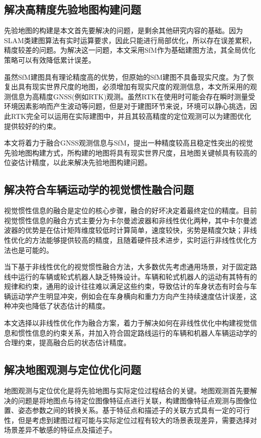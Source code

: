 \subsection{解决高精度先验地图构建问题}

先验地图的构建是本文首先要解决的问题，是剩余其他研究内容的基础。因为SLAM类建图算法有实时运算要求，因此只能进行局部优化，所以存在误差累积，精度较差的问题。为解决这一问题，本文采用SfM作为基础建图方法，其全局优化策略可以有效降低累计误差。

虽然SfM建图具有理论精度高的优势，但原始的SfM建图不具备现实尺度。为了恢复出具有现实世界尺度的地图，必须增加有现实尺度的观测信息，本文所采用的观测信息为高精度GNSS(例如RTK)观测。虽然RTK在使用时可能会存在瞬时测量受环境因素影响而产生波动等问题，但是对于建图环节来说，环境可以静心挑选，因此RTK完全可以运用在实际建图中，并且其较高精度的定位观测可以为建图优化提供较好的约束。

本文将着力于融合GNSS观测信息与SfM，提出一种精度较高且稳定性突出的视觉先验地图构建方式，所构建的地图将具有现实世界尺度，且地图关键帧具有较高的位姿估计精度，以此来解决先验地图构建问题。

\subsection{解决符合车辆运动学的视觉惯性融合问题}

视觉惯性信息的融合是定位的核心步骤，融合的好坏决定着最终定位的精度。目前视觉惯性信息的融合方式主要分为卡尔曼滤波器和非线性优化两种，其中卡尔曼滤波器的优势是在估计矩阵维度较低时计算简单，速度较快，劣势是精度欠缺；非线性优化的方法能够提供较高的精度，且随着硬件技术进步，实时运行非线性优化方法也是可能的。

当下基于非线性优化的视觉惯性融合方法，大多数优先考虑通用场景，对于固定路线中运行的车辆或轮式机器人缺乏特殊设计。车辆和轮式机器人的运动有其特有的规律和约束，通用的设计往往难以满足这些约束，导致估计的车身状态有时会与车辆运动学产生明显冲突，例如会在车身横向和重力方向产生持续速度估计误差，这种冲突也降低了状态估计的精度。

本文选择以非线性优化作为融合方案，着力于解决如何在非线性优化中构建视觉信息和惯性信息的约束关系，并加入符合固定路线运行的车辆和机器人车辆运动学的合理约束，提高融合后的状态估计精度。

\subsection{解决地图观测与定位优化问题}

地图观测与定位优化是将先验地图与实际定位过程结合的关键。地图观测首先要解决的问题是将地图点与待定位图像特征点进行关联，构建图像特征点观测与图像位置、姿态参数之间的转换关系。基于特征点和描述子的关联方式具有一定的可行性，但是考虑到建图过程可能与实际定位过程有较大的场景表现差异，需要选择对场景差异不敏感的特征点及描述子。

